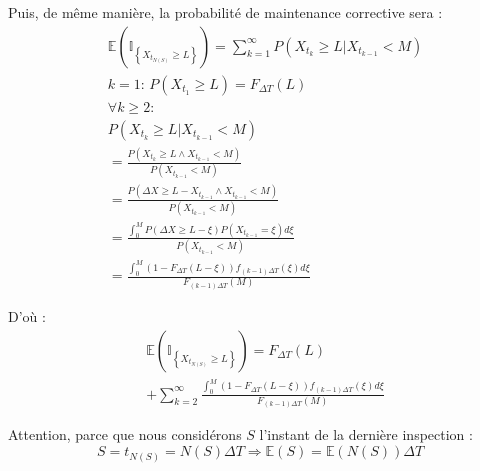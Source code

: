 \documentclass[10pt,a4paper]{article}
\begin{document}
Puis, de même manière, la probabilité de maintenance corrective sera :
\begin{align*}
    & \mathbb{E}\left( {{\mathbb{I}_{\left\{ {{X_{{t_{N\left( S \right)}}}} \geqslant L} \right\}}}} \right) = \sum\limits_{k = 1}^\infty  {P\left( {{X_{{t_k}}} \geqslant L|{X_{{t_{k - 1}}}} < M} \right)} \\
    & k = 1 : \, P\left( {{X_{{t_1}}} \geqslant L} \right) = {F_{\Delta T}}\left( L \right) \\
    & \forall k \geqslant 2: \\
    & P\left( {{X_{{t_k}}} \geqslant L|{X_{{t_{k - 1}}}} < M} \right) \\
    & = \frac{{P\left( {{X_{{t_k}}} \geqslant L \wedge {X_{{t_{k - 1}}}} < M} \right)}}{{P\left( {{X_{{t_{k - 1}}}} < M} \right)}} \\
    & = \frac{{P\left( {\Delta X \geqslant L - {X_{{t_{k - 1}}}} \wedge {X_{{t_{k - 1}}}} < M} \right)}}{{P\left( {{X_{{t_{k - 1}}}} < M} \right)}} \\
    & = \frac{{\int_0^M {P\left( {\Delta X \geqslant L - \xi } \right)P\left( {{X_{{t_{k - 1}}}} = \xi } \right)d\xi } }}{{P\left( {{X_{{t_{k - 1}}}} < M} \right)}}\\
    & = \frac{{\int_0^M {\left( {1 - {F_{\Delta T}}\left( {L - \xi } \right)} \right){f_{\left( {k - 1} \right)\Delta T}}\left( \xi  \right)d\xi } }}{{{F_{\left( {k - 1} \right)\Delta T}}\left( M \right)}}
\end{align*}

D'où :
\begin{align}
    \label{p_c_de}
    & \mathbb{E}\left( {{\mathbb{I}_{\left\{ {{X_{{t_{N\left( S \right)}}}} \geqslant L} \right\}}}} \right) = {F_{\Delta T}}\left( L \right) \nonumber \\
    & + \sum\limits_{k = 2}^\infty  {\frac{{\int_0^M {\left( {1 - {F_{\Delta T}}\left( {L - \xi } \right)} \right){f_{\left( {k - 1} \right)\Delta T}}\left( \xi  \right)d\xi } }}{{{F_{\left( {k - 1} \right)\Delta T}}\left( M \right)}}}
\end{align}

Attention, parce que nous considérons $S$ l'instant de la dernière inspection :
\[S = {t_{N\left( S \right)}} = N\left( S \right)\Delta T \Rightarrow \mathbb{E}\left( S \right) = \mathbb{E}\left( {N\left( S \right)} \right)\Delta T\]
\end{document}
